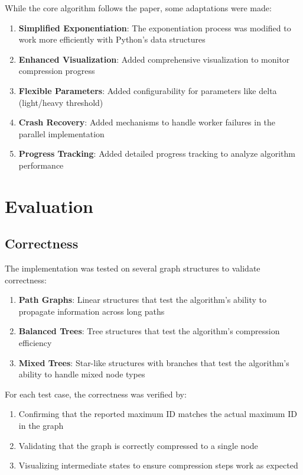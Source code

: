 \documentclass[11pt,a4paper]{article}
\begin{document}
While the core algorithm follows the paper, some adaptations were made:

\begin{enumerate}
    \item \textbf{Simplified Exponentiation}: The exponentiation process was modified to work more efficiently with Python's data structures
    \item \textbf{Enhanced Visualization}: Added comprehensive visualization to monitor compression progress
    \item \textbf{Flexible Parameters}: Added configurability for parameters like delta (light/heavy threshold)
    \item \textbf{Crash Recovery}: Added mechanisms to handle worker failures in the parallel implementation
    \item \textbf{Progress Tracking}: Added detailed progress tracking to analyze algorithm performance
\end{enumerate}

\section{Evaluation}

\subsection{Correctness}

The implementation was tested on several graph structures to validate correctness:

\begin{enumerate}
    \item \textbf{Path Graphs}: Linear structures that test the algorithm's ability to propagate information across long paths
    \item \textbf{Balanced Trees}: Tree structures that test the algorithm's compression efficiency
    \item \textbf{Mixed Trees}: Star-like structures with branches that test the algorithm's ability to handle mixed node types
\end{enumerate}

For each test case, the correctness was verified by:
\begin{enumerate}
    \item Confirming that the reported maximum ID matches the actual maximum ID in the graph
    \item Validating that the graph is correctly compressed to a single node
    \item Visualizing intermediate states to ensure compression steps work as expected
\end{enumerate}
\end{document}
